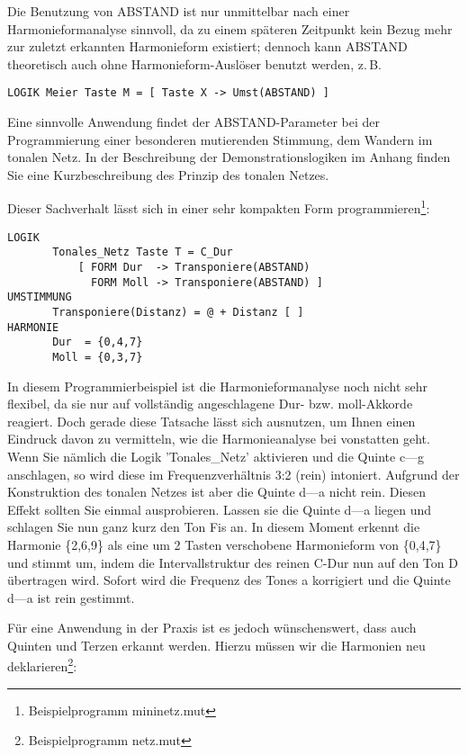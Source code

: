 Die Benutzung von ABSTAND ist nur unmittelbar nach einer 
Harmonieformanalyse sinnvoll, da zu einem späteren Zeitpunkt kein Bezug 
mehr zur zuletzt erkannten Harmonieform existiert; dennoch kann ABSTAND 
theoretisch auch ohne Harmonieform-Auslöser benutzt werden, z.\,B.
\begin{verbatim}
LOGIK Meier Taste M = [ Taste X -> Umst(ABSTAND) ]
\end{verbatim}

Eine sinnvolle Anwendung findet der ABSTAND-Parameter bei der
Programmierung einer besonderen mutierenden Stimmung, dem Wandern im
 tonalen Netz. In der Beschreibung der
Demonstrationslogiken im Anhang finden Sie eine Kurzbeschreibung des
Prinzip des tonalen Netzes.

Dieser Sachverhalt lässt sich in einer sehr kompakten Form 
programmieren\footnote{Beispielprogramm mininetz.mut}:
\label{MININETZ}
\begin{verbatim}
LOGIK
       Tonales_Netz Taste T = C_Dur
           [ FORM Dur  -> Transponiere(ABSTAND)
             FORM Moll -> Transponiere(ABSTAND) ]
UMSTIMMUNG
       Transponiere(Distanz) = @ + Distanz [ ]
HARMONIE
       Dur  = {0,4,7}
       Moll = {0,3,7}
\end{verbatim}

In diesem Programmierbeispiel ist die Harmonieformanalyse noch nicht sehr 
flexibel, da sie nur auf vollständig angeschlagene Dur- bzw. moll-Akkorde 
reagiert. Doch gerade diese Tatsache lässt sich ausnutzen, um Ihnen einen 
Eindruck davon zu vermitteln, wie die Harmonieanalyse bei \mutabor{} 
vonstatten geht. Wenn Sie nämlich die Logik 'Tonales\_Netz' aktivieren und 
die Quinte c---g anschlagen, so wird diese im Frequenzverhältnis 3:2 (rein) 
intoniert. Aufgrund der Konstruktion des tonalen Netzes ist aber die Quinte 
d---a nicht rein. Diesen Effekt sollten Sie einmal ausprobieren. Lassen 
sie die Quinte d---a liegen und schlagen Sie nun ganz kurz den Ton Fis an. 
In diesem Moment erkennt \mutabor{} die Harmonie \{2,6,9\} als eine um 2 
Tasten verschobene Harmonieform von \{0,4,7\} und stimmt um, indem die 
Intervallstruktur des reinen C-Dur nun auf den Ton D übertragen wird. 
Sofort wird die Frequenz des Tones a korrigiert und die Quinte d---a ist 
rein gestimmt.

Für eine Anwendung in der Praxis ist es jedoch wünschenswert, dass auch 
Quinten und Terzen erkannt werden. Hierzu müssen wir die Harmonien neu 
deklarieren\footnote{Beispielprogramm netz.mut}:
\label{NETZ}

